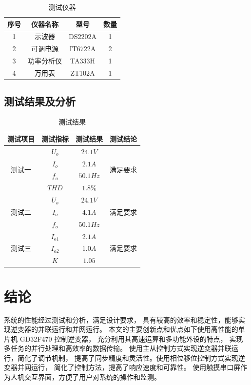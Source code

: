 \documentclass[a4paper,12pt]{article}
\begin{document}
\begin{table}[h]
    \centering
    \begin{tabular}{cccc}
    \toprule
    序号 & 仪器名称 & 型号 & 数量  \\ \midrule
    1 & 示波器 & DS2202A & 1\\
    2 & 可调电源 & IT6722A & 2 \\
    3 & 功率分析仪 & TA333H & 1 \\
    4 & 万用表 &  ZT102A & 1
    \\ \bottomrule
    \end{tabular}
    \caption{测试仪器}
\end{table}

\subsection{测试结果及分析}
\begin{table}
    \centering
    \begin{tabular}{@{}cccc@{}}
    \toprule
    测试项目 & 测试指标 & 测试结果 & 测试结论 \\ \midrule
    \multirow{4}{*}{测试一} & $U_o$ & $24.1V$ & \multirow{4}{*}{满足要求} \\
     & $I_o$ & $2.1A$ &  \\
     & $f_o$ & $50.1Hz$ &  \\
     & $THD$ & $1.8\%$ &  \\ \midrule
    \multirow{3}{*}{测试二} & $U_o$ & $24.1V$ & \multirow{3}{*}{满足要求} \\
        & $I_o$ & $4.1A$ &  \\
        & $f_o$ & $50.1Hz$ &  \\ \midrule
    \multirow{3}{*}{测试三} & $I_{o1}$ & $2.1A$ & \multirow{3}{*}{满足要求} \\
        & $I_{o2}$ & $1.0A$ &  \\
        & $K$ & $1.05$ &  \\ \bottomrule
    \end{tabular}
    \caption{测试结果}
\end{table}
\newpage
\section{结论}
系统的性能经过测试和分析，满足设计要求，
具有较高的效率和稳定性，能够实现逆变器的并联运行和并网运行。
本文的主要创新点和优点如下使用高性能的单片机 GD32F470 控制逆变器，
充分利用其高速运算和多功能外设的特点，
实现多任务的并行处理和高效率的数据传输。
使用主从控制方式实现逆变器并联运行，简化了调节机制，
提高了同步精度和灵活性。使用相位移位控制方式实现逆变器并网运行，
简化了控制方法，提高了响应速度和可靠性。
使用触摸串口屏作为人机交互界面，方便了用户对系统的操作和监测。
\end{document}
